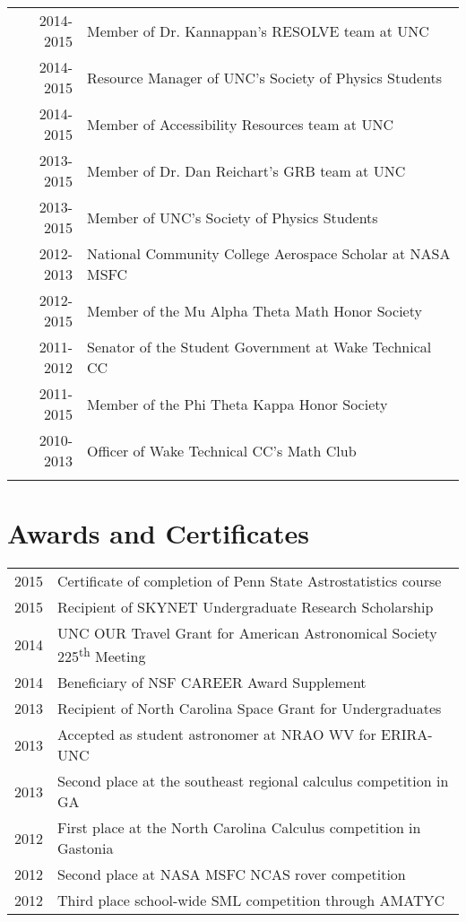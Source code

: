 \documentclass[a4paper,10pt]{article} %
\begin{document}
\begin{tabular}{rl}
2014-2015 & Member of Dr. Kannappan's RESOLVE team at UNC\\
2014-2015 & Resource Manager of UNC's Society of Physics Students\\
2014-2015 & Member of Accessibility Resources team at UNC\\
2013-2015 & Member of Dr. Dan Reichart's GRB team at UNC\\
2013-2015 & Member of UNC's Society of Physics Students\\
2012-2013 & National Community College Aerospace Scholar at NASA MSFC\\
2012-2015 & Member of the Mu Alpha Theta Math Honor Society\\
2011-2012 & Senator of the Student Government at Wake Technical CC\\
2011-2015 & Member of the Phi Theta Kappa Honor Society\\
2010-2013 & Officer of Wake Technical CC's Math Club\\
&\\
\end{tabular}
\bigskip


\section{Awards and Certificates}

\begin{tabular}{rl}
2015 & Certificate of completion of Penn State Astrostatistics course\\
2015 & Recipient of SKYNET Undergraduate Research Scholarship\\
2014 & UNC OUR Travel Grant for American Astronomical Society 225\textsuperscript{th} Meeting\\
2014 & Beneficiary of NSF CAREER Award Supplement\\
2013 & Recipient of North Carolina Space Grant for Undergraduates\\
2013 & Accepted as student astronomer at NRAO WV for ERIRA-UNC\\
2013 & Second place at the southeast regional calculus competition in GA\\
2012 & First place at the North Carolina Calculus competition in Gastonia \\
2012 & Second place at NASA MSFC NCAS rover competition\\
2012 & Third place school-wide SML competition through AMATYC\\
\end{tabular}
\bigskip
\end{document}
